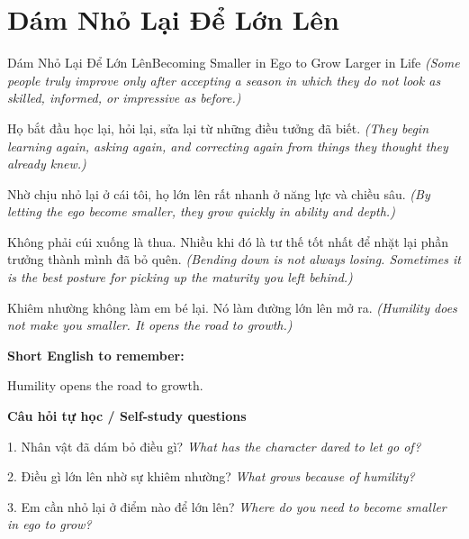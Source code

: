 \section{Dám Nhỏ Lại Để Lớn Lên}
\begin{truyen}{Dám Nhỏ Lại Để Lớn Lên}{Becoming Smaller in Ego to Grow Larger in Life}
\textit{(Some people truly improve only after accepting a season in which they do not look as skilled, informed, or impressive as before.)}

Họ bắt đầu học lại, hỏi lại, sửa lại từ những điều tưởng đã biết.
\textit{(They begin learning again, asking again, and correcting again from things they thought they already knew.)}

Nhờ chịu nhỏ lại ở cái tôi, họ lớn lên rất nhanh ở năng lực và chiều sâu.
\textit{(By letting the ego become smaller, they grow quickly in ability and depth.)}

Không phải cúi xuống là thua. Nhiều khi đó là tư thế tốt nhất để nhặt lại phần trưởng thành mình đã bỏ quên.
\textit{(Bending down is not always losing. Sometimes it is the best posture for picking up the maturity you left behind.)}

\end{truyen}

\begin{baihoc}
Khiêm nhường không làm em bé lại. Nó làm đường lớn lên mở ra.
\textit{(Humility does not make you smaller. It opens the road to growth.)}
\end{baihoc}

\begin{ghinhoanh}
\textbf{Short English to remember:}

Humility opens the road to growth.

\end{ghinhoanh}

\begin{tuhocnhanh}
\textbf{Câu hỏi tự học / Self-study questions}

1. Nhân vật đã dám bỏ điều gì? \textit{What has the character dared to let go of?}

2. Điều gì lớn lên nhờ sự khiêm nhường? \textit{What grows because of humility?}

3. Em cần nhỏ lại ở điểm nào để lớn lên? \textit{Where do you need to become smaller in ego to grow?}
\end{tuhocnhanh}
